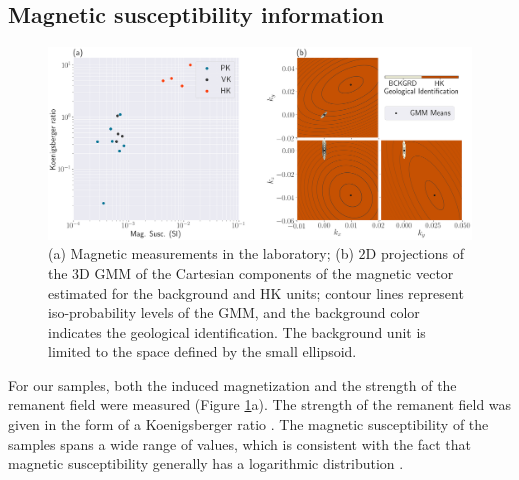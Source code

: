 \documentclass[paper, twocolumn]{geophysics} %
\begin{document}

\subsection{Magnetic susceptibility information}



\begin{figure}%
\centering
\includegraphics[width=\textwidth]{Figures/300dpi/Figure8.png}
\caption{(a) Magnetic measurements in the laboratory; (b) $2$D projections of the $3$D GMM of the Cartesian components of the magnetic vector estimated for the background and HK units; contour lines represent iso-probability levels of the GMM, and the background color indicates the geological identification. The background unit is limited to the space defined by the small ellipsoid.}
\label{fig:Figure8.png}
\end{figure}%

For our samples, both the induced magnetization and the strength of the remanent field were measured (Figure \ref{fig:Figure8.png}a). The strength of the remanent field was given in the form of a Koenigsberger ratio \citep{Koenigsberger}. The magnetic susceptibility of the samples spans a wide range of values, which is consistent with the fact that magnetic susceptibility generally has a logarithmic distribution \citep{LogMag,LogMag2,Enkin}.
\end{document}
